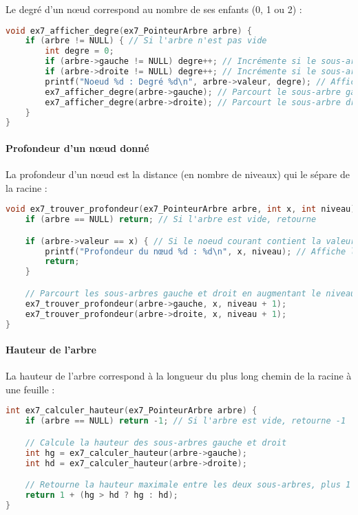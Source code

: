 \documentclass[a4paper,12pt]{article}
\begin{document}
Le degré d’un nœud correspond au nombre de ses enfants (0, 1 ou 2) :

\begin{lstlisting}[language=C, caption={Degré des nœuds}]
void ex7_afficher_degre(ex7_PointeurArbre arbre) {
    if (arbre != NULL) { // Si l'arbre n'est pas vide
        int degre = 0;
        if (arbre->gauche != NULL) degre++; // Incrémente si le sous-arbre gauche existe
        if (arbre->droite != NULL) degre++; // Incrémente si le sous-arbre droit existe
        printf("Noeud %d : Degré %d\n", arbre->valeur, degre); // Affiche le degré du nœud
        ex7_afficher_degre(arbre->gauche); // Parcourt le sous-arbre gauche
        ex7_afficher_degre(arbre->droite); // Parcourt le sous-arbre droit
    }
}

\end{lstlisting}

\paragraph{Profondeur d’un nœud donné}

La profondeur d’un nœud est la distance (en nombre de niveaux) qui le sépare de la racine :

\begin{lstlisting}[language=C, caption={Recherche de la profondeur}]
void ex7_trouver_profondeur(ex7_PointeurArbre arbre, int x, int niveau) {
    if (arbre == NULL) return; // Si l'arbre est vide, retourne

    if (arbre->valeur == x) { // Si le noeud courant contient la valeur recherchee
        printf("Profondeur du nœud %d : %d\n", x, niveau); // Affiche la profondeur
        return;
    }

    // Parcourt les sous-arbres gauche et droit en augmentant le niveau
    ex7_trouver_profondeur(arbre->gauche, x, niveau + 1);
    ex7_trouver_profondeur(arbre->droite, x, niveau + 1);
}
\end{lstlisting}

\paragraph{Hauteur de l’arbre}

La hauteur de l’arbre correspond à la longueur du plus long chemin de la racine à une feuille :

\begin{lstlisting}[language=C, caption={Calcul de la hauteur}]
int ex7_calculer_hauteur(ex7_PointeurArbre arbre) {
    if (arbre == NULL) return -1; // Si l'arbre est vide, retourne -1

    // Calcule la hauteur des sous-arbres gauche et droit
    int hg = ex7_calculer_hauteur(arbre->gauche);
    int hd = ex7_calculer_hauteur(arbre->droite);

    // Retourne la hauteur maximale entre les deux sous-arbres, plus 1
    return 1 + (hg > hd ? hg : hd);
}
\end{lstlisting}
\end{document}
